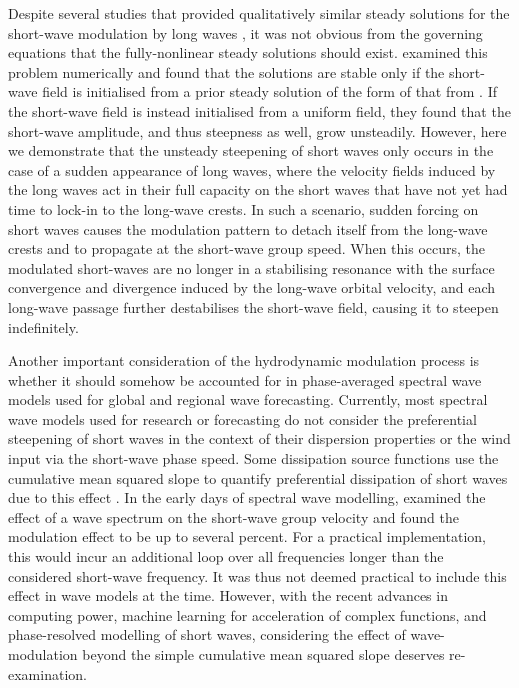 \documentclass[lineno]{jfm}
\begin{document}
Despite several studies that provided qualitatively similar steady solutions
for the short-wave modulation by long waves
\citep{longuet1960changes,phillips1981dispersion,longuet1987propagation,henyey1988energy,zhang1990evolution},
it was not obvious from the governing equations that the fully-nonlinear
steady solutions should exist.
\citet{peureux2021unsteady} examined this problem numerically and found that
the solutions are stable only if the short-wave field is initialised from
a prior steady solution of the form of that from \citet{longuet1960changes}.
If the short-wave field is instead initialised from a uniform field, they
found that the short-wave amplitude, and thus steepness as well, grow
unsteadily.
However, here we demonstrate that the unsteady steepening of short
waves only occurs in the case of a sudden appearance of long waves, where
the velocity fields induced by the long waves act in their full capacity
on the short waves that have not yet had time to lock-in to the long-wave
crests.
In such a scenario, sudden forcing on short waves causes the modulation
pattern to detach itself from the long-wave crests and to propagate at the
short-wave group speed.
When this occurs, the modulated short-waves are no longer in a stabilising
resonance with the surface convergence and divergence induced by the long-wave
orbital velocity, and each long-wave passage further destabilises the short-wave
field, causing it to steepen indefinitely.

Another important consideration of the hydrodynamic modulation process is
whether it should somehow be accounted for in phase-averaged spectral wave
models \citep{group1988wam,tolman1991third,donelan2012modeling} used for global
and regional wave forecasting.
Currently, most spectral wave models used for research or forecasting
do not consider the preferential steepening of short waves in the context
of their dispersion properties or the wind input via the short-wave phase speed.
Some dissipation source functions use the cumulative mean squared slope
to quantify preferential dissipation of short waves due to this effect
\citep{donelan2012modeling,romero2019distribution}.
In the early days of spectral wave modelling, \citet{willebrand1975energy}
examined the effect of a wave spectrum on the short-wave group velocity
and found the modulation effect to be up to several percent.
For a practical implementation, this would incur an additional loop over all
frequencies longer than the considered short-wave frequency.
It was thus not deemed practical to include this effect in wave models at the
time.
However, with the recent advances in computing power, machine learning for
acceleration of complex functions, and phase-resolved modelling of short waves,
considering the effect of wave-modulation beyond the simple cumulative mean
squared slope deserves re-examination.
\end{document}
